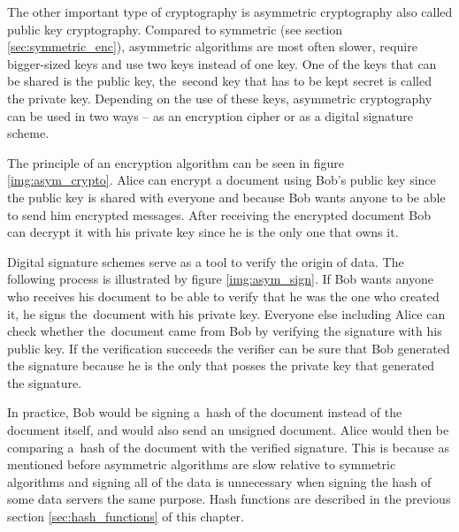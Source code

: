 The other important type of cryptography is asymmetric cryptography also called public key cryptography. Compared to symmetric (see section \ref{sec:symmetric_enc}), asymmetric algorithms are most often slower, require bigger-sized keys and use two keys instead of one key. One of the keys that can be shared is the public key, the~second key that has to be kept secret is called the private key. Depending on the use of these keys, asymmetric cryptography can be used in two ways -- as an encryption cipher or as a digital signature scheme.

The principle of an encryption algorithm can be seen in figure \ref{img:asym_crypto}. Alice can encrypt a document using Bob's public key since the public key is shared with everyone and because Bob wants anyone to be able to send him encrypted messages. After receiving the encrypted document Bob can decrypt it with his private key since he is the only one that owns it. \cite{Smart2004}


Digital signature schemes serve as a tool to verify the origin of data. The following process is illustrated by figure \ref{img:asym_sign}. If Bob wants anyone who receives his document to be able to verify that he was the one who created it, he signs the~document with his private key. Everyone else including Alice can check whether the~document came from Bob by verifying the signature with his public key. If the verification succeeds the verifier can be sure that Bob generated the signature because he is the only that posses the private key that generated the signature. \cite{Paar2010}

In practice, Bob would be signing a~hash of the document instead of the document itself, and would also send an unsigned document. Alice would then be comparing a~hash of the document with the verified signature. This is because as mentioned before asymmetric algorithms are slow relative to symmetric algorithms and signing all of the data is unnecessary when signing the hash of some data servers the same purpose. Hash functions are described in the previous section \ref{sec:hash_functions} of this chapter.

